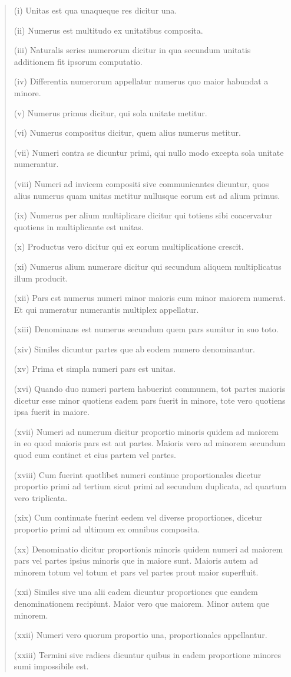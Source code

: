 \documentclass{article}
\begin{document}
\begin{quote}
(i) Unitas est qua unaqueque res dicitur una.

(ii) Numerus est multitudo ex unitatibus composita.

(iii) Naturalis series numerorum dicitur in qua secundum unitatis additionem fit ipsorum computatio.

(iv) Differentia numerorum appellatur numerus quo maior habundat a
minore.

(v) Numerus primus dicitur, qui sola unitate metitur.

(vi) Numerus compositus dicitur, quem alius numerus metitur.

(vii) Numeri contra se dicuntur primi, qui nullo modo excepta sola unitate
numerantur.

(viii) Numeri ad invicem compositi sive communicantes dicuntur, quos
alius numerus quam unitas metitur nullusque eorum est ad alium primus.

(ix) Numerus per alium multiplicare dicitur qui totiens sibi coacervatur
quotiens in multiplicante est unitas.

(x) Productus vero dicitur qui ex eorum multiplicatione crescit.

(xi) Numerus alium numerare dicitur qui secundum aliquem multiplicatus
illum producit.

(xii) Pars est numerus numeri minor maioris cum minor maiorem numerat.
Et qui numeratur numerantis multiplex appellatur.

(xiii) Denominans est numerus secundum quem pars sumitur in suo
toto.

(xiv) Similes dicuntur partes que ab eodem numero denominantur.

(xv) Prima et simpla numeri pars est unitas.

(xvi) Quando duo numeri partem habuerint communem, tot partes
maioris dicetur esse minor quotiens eadem pars fuerit in minore, tote vero
quotiens ipsa fuerit in maiore.

(xvii) Numeri ad numerum dicitur proportio minoris quidem ad maiorem
in eo quod maioris pars est aut partes. Maioris vero ad minorem secundum
quod eum continet et eius partem vel partes.

(xviii) Cum fuerint quotlibet numeri continue proportionales dicetur
proportio primi ad tertium sicut primi ad secundum duplicata, ad quartum
vero triplicata.

(xix) Cum continuate fuerint eedem vel diverse proportiones, dicetur
proportio primi ad ultimum ex omnibus composita.

(xx) Denominatio dicitur proportionis minoris quidem numeri ad maiorem
pars vel partes ipsius minoris que in maiore sunt. Maioris autem ad
minorem totum vel totum et pars vel partes prout maior superfluit.

(xxi) Similes sive una alii eadem dicuntur proportiones que eandem
denominationem recipiunt. Maior vero que maiorem. Minor autem que
minorem.

(xxii) Numeri vero quorum proportio una, proportionales appellantur.

(xxiii) Termini sive radices dicuntur quibus in eadem proportione
minores sumi impossibile est.
\end{quote}
\end{document}
